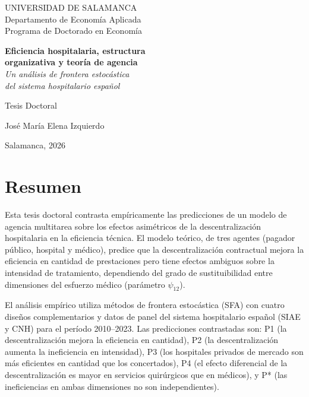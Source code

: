 \documentclass[12pt, a4paper, twoside, openright]{book}
\theoremstyle{plain}
\theoremstyle{definition}
\theoremstyle{remark}
\begin{document}

\begin{titlepage}
\centering
\vspace*{2cm}

{\large UNIVERSIDAD DE SALAMANCA}\\[0.3cm]
{\normalsize Departamento de Economía Aplicada}\\[0.3cm]
{\normalsize Programa de Doctorado en Economía}

\vspace{2.5cm}

{\LARGE\bfseries Eficiencia hospitalaria, estructura\\[0.3cm]
organizativa y teoría de agencia}\\[0.6cm]
{\Large\itshape Un análisis de frontera estocástica\\
del sistema hospitalario español}

\vspace{2.5cm}

{\large Tesis Doctoral}

\vspace{1.5cm}

{\large José María Elena Izquierdo}

\vfill

{\normalsize Salamanca, 2026}
\end{titlepage}

\frontmatter

\chapter*{Resumen}

Esta tesis doctoral contrasta empíricamente las predicciones de un modelo de agencia multitarea sobre los efectos asimétricos de la descentralización hospitalaria en la eficiencia técnica. El modelo teórico, de tres agentes (pagador público, hospital y médico), predice que la descentralización contractual mejora la eficiencia en cantidad de prestaciones pero tiene efectos ambiguos sobre la intensidad de tratamiento, dependiendo del grado de sustituibilidad entre dimensiones del esfuerzo médico (parámetro $\psi_{12}$).

El análisis empírico utiliza métodos de frontera estocástica (SFA) con cuatro diseños complementarios y datos de panel del sistema hospitalario español (SIAE y CNH) para el período 2010--2023. Las predicciones contrastadas son: P1 (la descentralización mejora la eficiencia en cantidad), P2 (la descentralización aumenta la ineficiencia en intensidad), P3 (los hospitales privados de mercado son más eficientes en cantidad que los concertados), P4 (el efecto diferencial de la descentralización es mayor en servicios quirúrgicos que en médicos), y P* (las ineficiencias en ambas dimensiones no son independientes).
\end{document}
